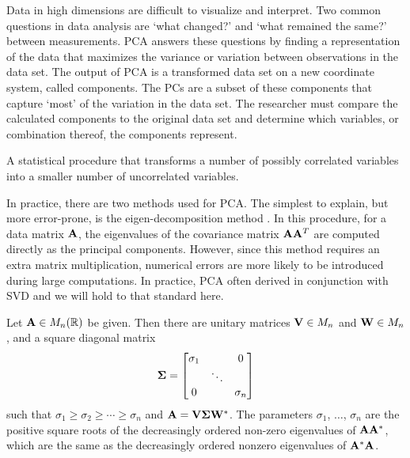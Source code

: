 Data in high dimensions are difficult to visualize and interpret.  Two common questions in data analysis are `what changed?' and `what
remained the same?' between measurements.  \gls{PCA} answers these questions by finding a representation of the data that maximizes
the \gls{variance} or variation between observations in the data set.  The output of \gls{PCA} is a transformed data set on a new coordinate
system, called components.  The \glspl{PC} are a subset of these components that capture `most' of the variation in the data set.  The researcher
must compare the calculated components to the original data set and determine which variables, or combination thereof, the components represent.

\begin{defn}
  A statistical procedure that transforms a number of possibly correlated variables into a smaller number of uncorrelated variables.
\end{defn}

In practice, there are two methods used for \gls{PCA}.  The simplest to explain, but more error-prone, is the eigen-decomposition
method \citep{smith2006}.  In this procedure, for a data matrix $\mathbf{A}$, the eigenvalues of the covariance matrix $\mathbf{A}\mathbf{A}^T$
are computed directly as the principal components.  However, since this method requires an extra matrix multiplication, numerical
errors are more likely to be introduced during large computations. In practice, \gls{PCA} often derived in conjunction with \gls{SVD}
and we will hold to that standard here.

\begin{thm}
  Let $\mathbf{A} \in M_{n}(\mathbb{R})$ be given. Then there are unitary matrices $\mathbf{V} \in M_n$ and $\mathbf{W} \in M_n$, and a square diagonal
  matrix
  \[
    \mathbf{\Sigma} =
      \begin{bmatrix}
        \sigma_1 &        & 0        \\
                 & \ddots &          \\
        0        &        & \sigma_n \\
      \end{bmatrix}
  \]
  such that $\sigma_1 \geq \sigma_2 \geq \cdots \geq \sigma_n$ and $\mathbf{A} = \mathbf{V}\mathbf{\Sigma}\mathbf{W}^*$.  The parameters $\sigma_1$,
  $\hdots$, $\sigma_n$ are the positive square roots of the decreasingly ordered non-zero eigenvalues of $\mathbf{A}\mathbf{A}^*$, which are the
  same as the decreasingly ordered nonzero eigenvalues of $\mathbf{A}^*\mathbf{A}$.
\end{thm}

